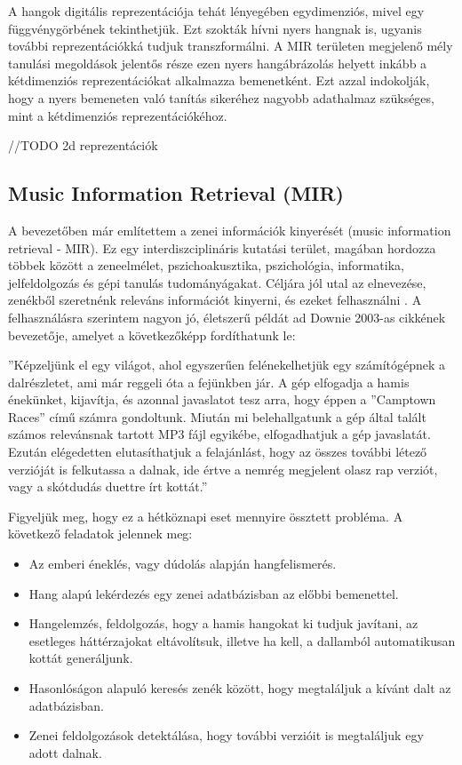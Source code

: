 A hangok digitális reprezentációja tehát lényegében egydimenziós, mivel egy függvénygörbének tekinthetjük. Ezt szokták hívni nyers hangnak is, ugyanis további reprezentációkká tudjuk transzformálni. A MIR területen megjelenő mély tanulási megoldások jelentős része ezen nyers hangábrázolás helyett inkább a kétdimenziós reprezentációkat alkalmazza bemenetként. Ezt azzal indokolják, hogy a nyers bemeneten való tanítás sikeréhez nagyobb adathalmaz szükséges, mint a kétdimenziós reprezentációkéhoz. \cite{Choi2017}

//TODO 2d reprezentációk


\subsection{Music Information Retrieval (MIR)} 

A bevezetőben már említettem a zenei információk kinyerését (music information retrieval - MIR). Ez egy interdiszciplináris kutatási terület, magában hordozza többek között a zeneelmélet, pszichoakusztika, pszichológia, informatika, jelfeldolgozás és gépi tanulás tudományágakat. Céljára jól utal az elnevezése, zenékből szeretnénk releváns információt kinyerni, és ezeket felhasználni \cite{Choi2017}. A felhasználásra szerintem nagyon jó, életszerű példát ad Downie 2003-as cikkének \cite{Downie2003} bevezetője, amelyet a következőképp fordíthatunk le:

''Képzeljünk el egy világot, ahol egyszerűen felénekelhetjük egy számítógépnek a dalrészletet, ami már reggeli óta a fejünkben jár. A gép elfogadja a hamis énekünket, kijavítja, és azonnal javaslatot tesz arra, hogy éppen a ''Camptown Races'' című számra gondoltunk. Miután mi belehallgatunk a gép által talált számos relevánsnak tartott MP3 fájl egyikébe, elfogadhatjuk a gép javaslatát. Ezután elégedetten elutasíthatjuk a felajánlást, hogy az összes további létező verzióját is felkutassa a dalnak, ide értve a nemrég megjelent olasz rap verziót, vagy a skótdudás duettre írt kottát.''  \cite{Downie2003}

Figyeljük meg, hogy ez a hétköznapi eset mennyire össztett probléma. A következő feladatok jelennek meg:
\begin{itemize}
\item Az emberi éneklés, vagy dúdolás alapján hangfelismerés.
\item Hang alapú lekérdezés egy zenei adatbázisban az előbbi bemenettel.
\item Hangelemzés, feldolgozás, hogy a hamis hangokat ki tudjuk javítani, az esetleges háttérzajokat eltávolítsuk, illetve ha kell, a dallamból automatikusan kottát generáljunk.
\item Hasonlóságon alapuló keresés zenék között, hogy megtaláljuk a kívánt dalt az adatbázisban.
\item Zenei feldolgozások detektálása, hogy további verzióit is megtaláljuk egy adott dalnak.
\end{itemize}

